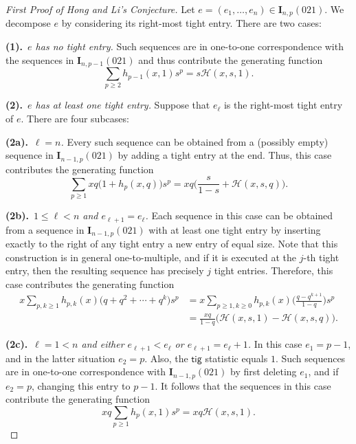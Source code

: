 \documentclass[reqno]{amsart}
\numberwithin{equation}{section}
\theoremstyle{plain}
\theoremstyle{definition}
\theoremstyle{named}
\newcommand{\bI}{\mathbf{I}}
\newcommand{\tig}{\mathsf{tig}}
\newcommand{\cH}{\mathcal{H}}
\begin{document}
\begin{proof}[First Proof of Hong and Li's Conjecture]
	Let $e=(e_1,\ldots,e_n)\in\bI_{n,p}(021)$. We decompose $e$ by considering its right-most tight entry.  
	There are two cases:
	
	\textbf{(1).}~\textit{$e$ has no tight entry.} Such sequences are in one-to-one correspondence with the sequences in $\bI_{n,p-1}(021)$ and thus contribute the generating function
	$$
	\sum_{p\geq2}h_{p-1}(x,1)s^p=s\cH(x,s,1).
	$$
	
	\textbf{(2).}~\textit{$e$ has at least one tight entry.} Suppose that  $e_{\ell}$ is the right-most tight entry of $e$. There are four subcases:
	
	\textbf{(2a).}~\textit{$\ell=n$.} Every such sequence can be obtained from a (possibly empty) sequence in $\bI_{n-1,p}(021)$ by adding a tight entry at the end. Thus, this case contributes the generating function
	$$
	\sum_{p\geq1}xq\big(1+h_p(x,q)\big)s^p=xq\bigg(\frac{s}{1-s}+\cH(x,s,q)\bigg).
	$$ 
	
	\textbf{(2b).}~\textit{$1\leq\ell<n$ and $e_{\ell+1}=e_{\ell}$.} Each sequence in this case can be obtained from a sequence in $\bI_{n-1,p}(021)$ with at least one tight entry  by inserting exactly to the right of any tight entry a new entry of equal size. Note that this construction is in general one-to-multiple, and if it is executed at the $j$-th tight entry, then the resulting sequence has precisely $j$ tight entries. Therefore,  this case contributes the generating function
	\begin{align*}
		x\sum_{p,k\geq1}h_{p,k}(x)\big(q+q^2+\cdots+q^k\big)s^p&=x\sum_{p\geq1,k\geq0}h_{p,k}(x)\bigg(\frac{q-q^{k+1}}{1-q}\bigg)s^p\\
		&=\frac{xq}{1-q}\big(\cH(x,s,1)-\cH(x,s,q)\big).
	\end{align*}

	\textbf{(2c).}~\textit{$\ell=1<n$ and either $e_{\ell+1}<e_{\ell}$ or $e_{\ell+1}=e_{\ell}+1$.} In this case $e_1=p-1$, and in the latter situation $e_2=p$. Also, the $\tig$ statistic equals $1$. Such sequences are in one-to-one correspondence with $\bI_{n-1,p}(021)$ by first deleting $e_1$, and if $e_2=p$, changing this entry to $p-1$.   It follows that the  sequences in this case contribute the generating function
	$$
	xq\sum_{p\geq1}h_{p}(x,1)s^p=xq\cH(x,s,1).
	$$
	

\end{proof}
\end{document}
